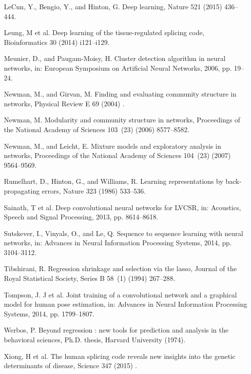 \documentclass[12pt]{article} %
\begin{document}
\begin{thebibliography}{10}
{LeCun, Y., Bengio, Y., and Hinton, G}. Deep learning, Nature 521 (2015) 436--444.
  \label{LeCun2015}

{Leung, M et al}. Deep learning of the tissue-regulated splicing
  code, Bioinformatics 30 (2014) i121--i129.

{Meunier, D., and Paugam-Moisy, H}. Cluster detection algorithm in neural
  networks, in: European Symposium on Artificial Neural Networks, 2006, pp.
  19--24.

{Newman, M., and Girvan, M}. Finding and evaluating community structure in
  networks, Physical Review E 69 (2004) {}.

{Newman, M}. Modularity and community structure in networks, Proceedings of the
  National Academy of Sciences 103~(23) (2006) 8577--8582.

{Newman, M., and Leicht, E}. Mixture models and exploratory analysis in networks,
  Proceedings of the National Academy of Sciences 104~(23) (2007) 9564--9569.

{Rumelhart, D., Hinton, G., and Williams, R}. Learning representations by
  back-propagating errors, Nature 323 (1986) 533--536.

{Sainath, T et al}. Deep convolutional
  neural networks for {LVCSR}, in: Acoustics, Speech and Signal Processing,
  2013, pp. 8614--8618.

{Sutskever, I., Vinyals, O., and Le, Q}. Sequence to sequence learning with neural
  networks, in: Advances in Neural Information Processing Systems, 2014, pp.
  3104--3112.

{Tibshirani, R}. Regression shrinkage and selection via the lasso, Journal of
  the Royal Statistical Society, Series B 58~(1) (1994) 267--288.

{Tompson, J. J et al}. Joint training of a
  convolutional network and a graphical model for human pose estimation, in:
  Advances in Neural Information Processing Systems, 2014, pp. 1799--1807.

{Werbos, P}. Beyond regression : new tools for prediction and analysis in the
  behavioral sciences, Ph.D. thesis, Harvard University (1974).

{Xiong, H et al}. The human splicing code
  reveals new insights into the genetic determinants of disease, Science 347
  (2015) {}.

\end{thebibliography}
\end{document}
